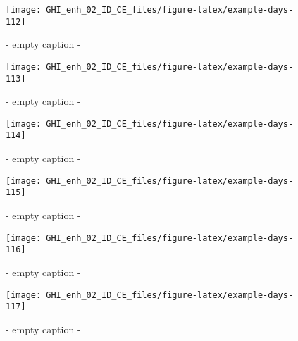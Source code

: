 \documentclass[
  10pt,
  a4paper,oneside]{article}
\begin{document}
\begin{figure}[H]

{\centering \texttt{[image: GHI\_enh\_02\_ID\_CE\_files/figure-latex/example-days-112]} 

}

\caption{ - empty caption - }\label{fig:example-days-112}
\end{figure}

\begin{figure}[H]

{\centering \texttt{[image: GHI\_enh\_02\_ID\_CE\_files/figure-latex/example-days-113]} 

}

\caption{ - empty caption - }\label{fig:example-days-113}
\end{figure}

\begin{figure}[H]

{\centering \texttt{[image: GHI\_enh\_02\_ID\_CE\_files/figure-latex/example-days-114]} 

}

\caption{ - empty caption - }\label{fig:example-days-114}
\end{figure}

\begin{figure}[H]

{\centering \texttt{[image: GHI\_enh\_02\_ID\_CE\_files/figure-latex/example-days-115]} 

}

\caption{ - empty caption - }\label{fig:example-days-115}
\end{figure}

\begin{figure}[H]

{\centering \texttt{[image: GHI\_enh\_02\_ID\_CE\_files/figure-latex/example-days-116]} 

}

\caption{ - empty caption - }\label{fig:example-days-116}
\end{figure}

\begin{figure}[H]

{\centering \texttt{[image: GHI\_enh\_02\_ID\_CE\_files/figure-latex/example-days-117]} 

}

\caption{ - empty caption - }\label{fig:example-days-117}
\end{figure}
\end{document}
